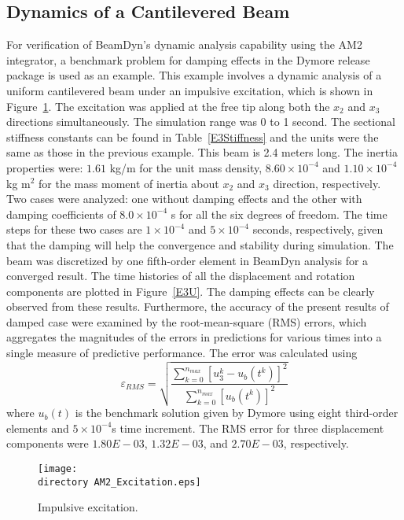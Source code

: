 \documentclass{aiaa-tc}
\def\directory{EPSF/}
\begin{document}
\subsection{Dynamics of a Cantilevered Beam}
For verification of BeamDyn's dynamic analysis capability using the AM2 integrator, a benchmark problem for damping effects in the Dymore release package is used as an example. This example involves a dynamic analysis of a uniform cantilevered beam under an impulsive excitation, which is shown in Figure~\ref{Impulsive}. The excitation was applied at the free tip along both the $x_2$ and $x_3$ directions simultaneously. The simulation range was 0 to 1 second. The sectional stiffness constants can be found in Table~\ref{E3Stiffness} and the units were the same as those in the previous example. This beam is 2.4 meters long. The inertia properties were: $1.61$ kg/m for the unit mass density, $8.60 \times 10^{-4}$ and $1.10 \times 10^{-4}$ kg m$^{2}$ for the mass moment of inertia about $x_2$ and $x_3$ direction, respectively.   Two cases were analyzed: one without damping effects and the other with damping coefficients of $8.0 \times  10^{-4}$ s for all the six degrees of freedom. The time steps for these two cases are $1 \times 10^{-4}$ and $5 \times 10^{-4}$ seconds, respectively, given that the damping will help the convergence and stability during simulation. The beam was discretized by one fifth-order element in BeamDyn analysis for a converged result. The time histories of all the displacement and rotation components are plotted in Figure~\ref{E3U}. The damping effects can be clearly observed from these results. Furthermore, the accuracy of the present results of damped case were examined by the root-mean-square (RMS) errors, which aggregates the magnitudes of the errors in predictions for various times into a single measure of predictive performance. The error was calculated using
\begin{equation}
\varepsilon_{RMS}=\sqrt{\frac{\sum_{k=0}^{n_{max}}[u_3^k-u_b(t^k)]^2}{\sum_{k=0}^{n_{max}}[u_b(t^k)]^2}}
\end{equation} 
where $u_b(t)$ is the benchmark solution given by Dymore using eight third-order elements and $5 \times 10^{-4}$s time increment. The RMS error for three displacement components were $1.80E-03$, $1.32E-03$, and $2.70E-03$, respectively. 
 
\begin{figure}
\centering
\texttt{[image: \\directory AM2\_Excitation.eps]}
\caption{ Impulsive excitation.} 
\label{Impulsive}
\end{figure}
\end{document}
